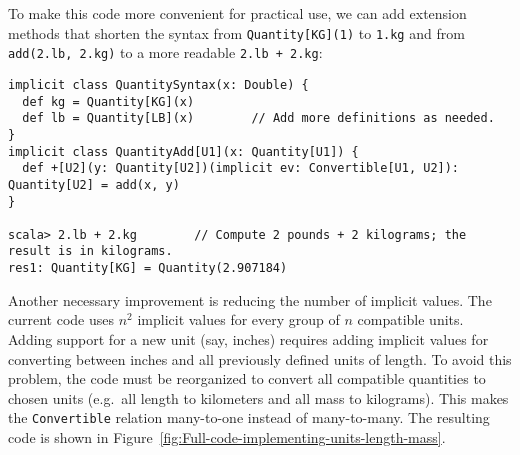 To make this code more convenient for practical use, we can add extension
methods that shorten the syntax from \lstinline!Quantity[KG](1)!
to \lstinline!1.kg! and from \lstinline!add(2.lb, 2.kg)! to a more
readable \lstinline!2.lb + 2.kg!:
\begin{lstlisting}
implicit class QuantitySyntax(x: Double) {
  def kg = Quantity[KG](x)
  def lb = Quantity[LB](x)        // Add more definitions as needed.
}
implicit class QuantityAdd[U1](x: Quantity[U1]) {
  def +[U2](y: Quantity[U2])(implicit ev: Convertible[U1, U2]): Quantity[U2] = add(x, y)
}

scala> 2.lb + 2.kg        // Compute 2 pounds + 2 kilograms; the result is in kilograms.
res1: Quantity[KG] = Quantity(2.907184)
\end{lstlisting}

Another necessary improvement is reducing the number of implicit values.
The current code uses $n^{2}$ implicit values for every group of
$n$ compatible units. Adding support for a new unit (say, inches)
requires adding implicit values for converting between inches and
all previously defined units of length. To avoid this problem, the
code must be reorganized to convert all compatible quantities to chosen
units (e.g.~all length to kilometers and all mass to kilograms).
This makes the \lstinline!Convertible! relation many-to-one
instead of many-to-many. The resulting code is shown in Figure~\ref{fig:Full-code-implementing-units-length-mass}.

